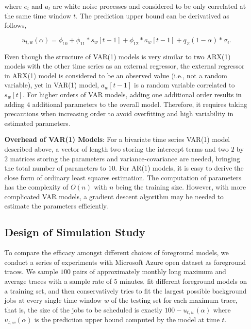 \documentclass[sigplan,10pt,review,anonymous]{acmart}
\begin{document}
where $e_t$ and $a_t$ are white noise processes and considered to be only
correlated at the same time window $t$. The prediction upper bound can be
derivatived as follows,

\begin{equation}
  u_{t, w}(\alpha) = \phi_{10} + \phi_{11} * s_w[t - 1] + \phi_{12} * a_w[t - 1] + q_Z(1 - \alpha) * \sigma_{\epsilon}.
\end{equation}

Even though the structure of VAR(1) models is very similar to two ARX(1) models
with the other time series as an external regressor, the external regressor in
ARX(1) model is considered to be an observed value (i.e., not a random
variable), yet in VAR(1) model, $a_w[t - 1]$ is a random variable correlated to
$s_w[t]$. For higher orders of VAR models, adding one additional order results
in adding $4$ additional parameters to the overall model. Therefore, it requires
taking precautions when increasing order to avoid overfitting and high
variability in estimated parameters. 
  
\textbf{Overhead of VAR(1) Models}: For a bivariate time series VAR(1) model
described above, a vector of length two storing the intercept terms and two $2$
by $2$ matrices storing the parameters and variance-covariance are needed,
bringing the total number of parameters to $10$. For AR(1) models, it is easy to
derive the close form of ordinary least squares estimation. The computation of
parameters has the complexity of $O(n)$ with $n$ being the training size.
However, with more complicated VAR models, a gradient descent algorithm may be
needed to estimate the parameters efficiently.
    
\subsection{Design of Simulation Study}
\label{sec:section3.2}

To compare the efficacy amongst different choices of foreground models, we
conduct a series of experiments with Microsoft Azure open dataset as foreground
traces. We sample $100$ pairs of approximately monthly long maximum and average
traces with a sample rate of $5$ minutes, fit different foreground models on a
training set, and then conservatively tries to fit the largest possible
background jobs at every single time window $w$ of the testing set for each
maximum trace, that is, the size of the jobs to be scheduled is exactly $100 -
u_{t, w}(\alpha)$ where $u_{t, w}(\alpha)$ is the prediction upper bound
computed by the model at time $t$.
\end{document}
